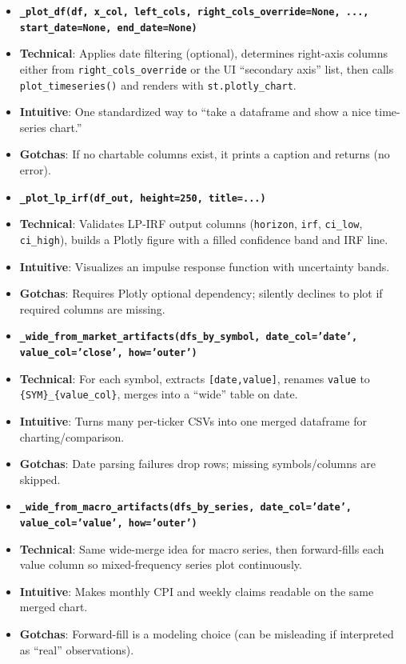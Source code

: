 \documentclass[11pt]{article}
\begin{document}
\begin{itemize}[leftmargin=*,nosep]
\item \textbf{\texttt{\_plot\_df(df, x\_col, left\_cols, right\_cols\_override=None, ..., start\_date=None, end\_date=None)}}
\item \textbf{Technical}: Applies date filtering (optional), determines right-axis columns either from \texttt{right\_cols\_override} or the UI “secondary axis” list, then calls \texttt{plot\_timeseries()} and renders with \texttt{st.plotly\_chart}.
\item \textbf{Intuitive}: One standardized way to “take a dataframe and show a nice time-series chart.”
\item \textbf{Gotchas}: If no chartable columns exist, it prints a caption and returns (no error).
\end{itemize}


\begin{itemize}[leftmargin=*,nosep]
\item \textbf{\texttt{\_plot\_lp\_irf(df\_out, height=250, title=...)}}
\item \textbf{Technical}: Validates LP-IRF output columns (\texttt{horizon}, \texttt{irf}, \texttt{ci\_low}, \texttt{ci\_high}), builds a Plotly figure with a filled confidence band and IRF line.
\item \textbf{Intuitive}: Visualizes an impulse response function with uncertainty bands.
\item \textbf{Gotchas}: Requires Plotly optional dependency; silently declines to plot if required columns are missing.
\end{itemize}


\begin{itemize}[leftmargin=*,nosep]
\item \textbf{\texttt{\_wide\_from\_market\_artifacts(dfs\_by\_symbol, date\_col='date', value\_col='close', how='outer')}}
\item \textbf{Technical}: For each symbol, extracts \texttt{[date,value]}, renames \texttt{value} to \texttt{\{SYM\}\_\{value\_col\}}, merges into a “wide” table on date.
\item \textbf{Intuitive}: Turns many per-ticker CSVs into one merged dataframe for charting/comparison.
\item \textbf{Gotchas}: Date parsing failures drop rows; missing symbols/columns are skipped.
\end{itemize}


\begin{itemize}[leftmargin=*,nosep]
\item \textbf{\texttt{\_wide\_from\_macro\_artifacts(dfs\_by\_series, date\_col='date', value\_col='value', how='outer')}}
\item \textbf{Technical}: Same wide-merge idea for macro series, then forward-fills each value column so mixed-frequency series plot continuously.
\item \textbf{Intuitive}: Makes monthly CPI and weekly claims readable on the same merged chart.
\item \textbf{Gotchas}: Forward-fill is a modeling choice (can be misleading if interpreted as “real” observations).
\end{itemize}
\end{document}
